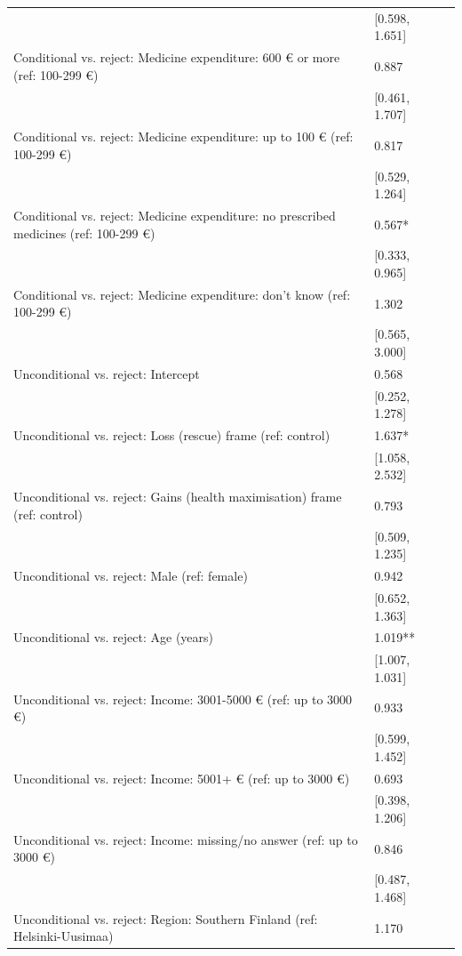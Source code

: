 \begin{tabular}{lll}
& [\num{0.598}, \num{1.651}] &  \\
Conditional vs. reject: Medicine expenditure: 600 € or more (ref: 100-299 €) & \num{0.887} &  \\
& [\num{0.461}, \num{1.707}] &  \\
Conditional vs. reject: Medicine expenditure: up to 100 € (ref: 100-299 €) & \num{0.817} &  \\
& [\num{0.529}, \num{1.264}] &  \\
Conditional vs. reject: Medicine expenditure: no prescribed medicines (ref: 100-299 €) & \num{0.567}* &  \\
& [\num{0.333}, \num{0.965}] &  \\
Conditional vs. reject: Medicine expenditure: don't know (ref: 100-299 €) & \num{1.302} &  \\
& [\num{0.565}, \num{3.000}] &  \\
Unconditional vs. reject: Intercept & \num{0.568} &  \\
& [\num{0.252}, \num{1.278}] &  \\
Unconditional vs. reject: Loss (rescue) frame (ref: control) & \num{1.637}* &  \\
& [\num{1.058}, \num{2.532}] &  \\
Unconditional vs. reject: Gains (health maximisation) frame (ref: control) & \num{0.793} &  \\
& [\num{0.509}, \num{1.235}] &  \\
Unconditional vs. reject: Male (ref: female) & \num{0.942} &  \\
& [\num{0.652}, \num{1.363}] &  \\
Unconditional vs. reject: Age (years) & \num{1.019}** &  \\
& [\num{1.007}, \num{1.031}] &  \\
Unconditional vs. reject: Income: 3001-5000 € (ref: up to 3000 €) & \num{0.933} &  \\
& [\num{0.599}, \num{1.452}] &  \\
Unconditional vs. reject: Income: 5001+ € (ref: up to 3000 €) & \num{0.693} &  \\
& [\num{0.398}, \num{1.206}] &  \\
Unconditional vs. reject: Income: missing/no answer (ref: up to 3000 €) & \num{0.846} &  \\
& [\num{0.487}, \num{1.468}] &  \\
Unconditional vs. reject: Region: Southern Finland (ref: Helsinki-Uusimaa) & \num{1.170} &  \\

\end{tabular}
